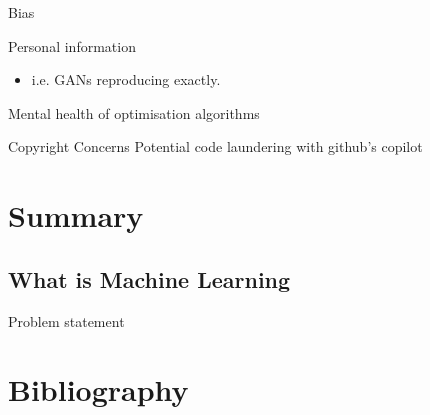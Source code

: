 \documentclass[10pt]{beamer}
\begin{document}
\begin{frame}[label={sec:org3462e72}]{Bias}
\end{frame}

\begin{frame}[label={sec:org27caf8d}]{Personal information}
\begin{itemize}
\item i.e. GANs reproducing exactly.
\end{itemize}
\end{frame}

\begin{frame}[label={sec:org3db3e61}]{Mental health of optimisation algorithms}
\end{frame}

\begin{frame}[label={sec:orgc7b0aad}]{Copyright Concerns}
Potential code laundering with github's copilot
\end{frame}

\section*{Summary}
\label{sec:org523982c}

\subsection*{What is Machine Learning}
\label{sec:org8f8c710}

\begin{frame}[label={sec:orga9497d8}]{Problem statement}
\end{frame}

\section*{Bibliography}
\label{sec:org1e46965}
\end{document}
